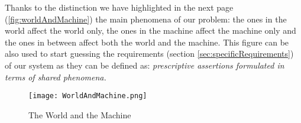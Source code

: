 	Thanks to the distinction we have highlighted in the next page (\autoref{fig:worldAndMachine}) the main phenomena of our problem: the ones in the world affect the world only, the ones in the machine affect the machine only and the ones in between affect both the world and the machine. This figure can be also used to start guessing the requirements (section \ref{sec:specificRequirements}) of our system as they can be defined as: \textit{prescriptive assertions formulated in terms of shared phenomena.}
	\vspace{1cm} 
	
	\begin{figure}[h]
		\centering
		\texttt{[image: WorldAndMachine.png]}
		\caption{\label{fig:worldAndMachine}The World and the Machine}
	\end{figure}
 	 